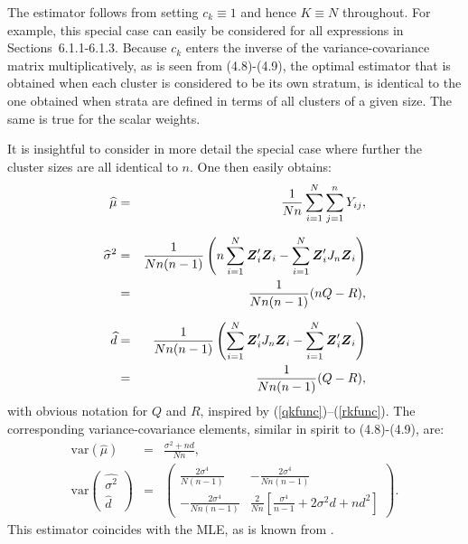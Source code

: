 \documentclass[11pt,a5paper,twoside]{book}
\newcommand{\BZ}{\mbox{\boldmath $Z$}}
\begin{document}
{The estimator follows from setting $c_k\equiv 1$ and hence $K\equiv N$ 
throughout. For example, this special case can easily be considered 
for all expressions in Sections~6.1.1-6.1.3.
Because $c_k$ 
enters the inverse of the variance-covariance matrix multiplicatively, as 
is seen from (4.8)-(4.9),
the optimal 
estimator that is obtained when each cluster is considered to be its own 
stratum, is identical to the one obtained when strata are defined in 
terms of all clusters of a given size. The same is true for the scalar 
weights.

It is insightful to consider in more detail the special case where 
further the cluster sizes are all identical to $n$. One then easily 
obtains:
\begin{eqnarray}
\label{muconstant}
\widehat{\mu}&=&\frac{1}{Nn}\sum_{i=1}^{N}\sum_{j=1}^{n}Y_{ij},\\[2mm]
\widehat{\sigma}^2&=&\frac{1}{Nn(n-1)}\left(
n\sum_{i=1}^{N}\BZ_{i}'\BZ_{i}-\sum_{i=1}^{N}\BZ_{i}'J_{n}\BZ_{i}
\right)  \\
&=&\frac{1}{Nn(n-1)}(nQ-R),\label{sigmaconstant}\\[2mm]
\widehat{d}&=&
\frac{1}{Nn(n-1)}\left(
\sum_{i=1}^{N}\BZ_{i}'J_{n}\BZ_i-\sum_{i=1}^{N}\BZ_{i}'\BZ_{i}
\right) \\
&=& \frac{1}{Nn(n-1)}(Q-R),\label{dconstant}
\end{eqnarray}
with obvious notation for $Q$ and $R$, inspired by
(\ref{qkfunc})--(\ref{rkfunc}). The corresponding variance-covariance 
elements, similar in spirit to (4.8)-(4.9),
are:
\begin{eqnarray}
\label{varexprmucbyc}
\mbox{var}(\widehat{\mu})&=&\frac{\sigma^2+nd}{Nn},\\
\label{varexprsigmadcbyc}
\mbox{var}\left(\begin{array}{c}\widehat{\sigma^2}\\ \widehat{d}\end{array}\right)&=&
\left(
\begin{array}{cc}
\frac{2\sigma^4}{N(n-1)}&-\frac{2\sigma^4}{Nn(n-1)}\\
-\frac{2\sigma^4}{Nn(n-1)}&
\frac{2}{Nn}\left[\frac{\sigma^4}{n-1}+2\sigma^2d+nd^2\right]
\end{array}
\right).
\end{eqnarray}
This estimator coincides with the MLE, as is known from \cite{Iddi2011}.


}
\end{document}
